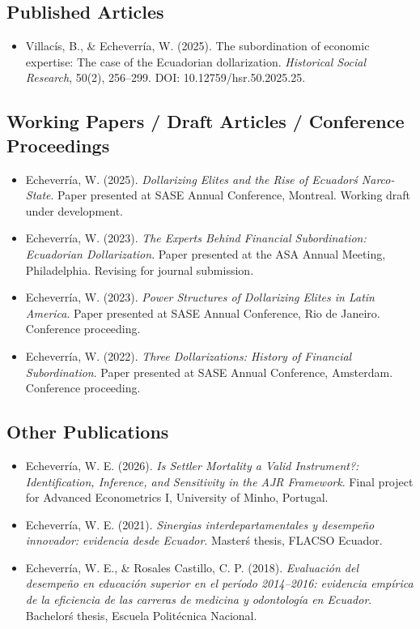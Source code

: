 ﻿\documentclass[11pt]{article}
\begin{document}
\subsection*{Published Articles}
\begin{itemize}
\item Villac\'is, B., \& Echeverr\'ia, W. (2025). The subordination of economic expertise: The case of the Ecuadorian dollarization. \textit{Historical Social Research}, 50(2), 256--299. DOI: 10.12759/hsr.50.2025.25.
\end{itemize}

\subsection*{Working Papers / Draft Articles / Conference Proceedings}
\begin{itemize}
\item Echeverr\'ia, W. (2025). \textit{Dollarizing Elites and the Rise of Ecuador\'s Narco-State}. Paper presented at SASE Annual Conference, Montreal. Working draft under development.
\item Echeverr\'ia, W. (2023). \textit{The Experts Behind Financial Subordination: Ecuadorian Dollarization}. Paper presented at the ASA Annual Meeting, Philadelphia. Revising for journal submission.
\item Echeverr\'ia, W. (2023). \textit{Power Structures of Dollarizing Elites in Latin America}. Paper presented at SASE Annual Conference, Rio de Janeiro. Conference proceeding.
\item Echeverr\'ia, W. (2022). \textit{Three Dollarizations: History of Financial Subordination}. Paper presented at SASE Annual Conference, Amsterdam. Conference proceeding.
\end{itemize}

\subsection*{Other Publications}
\begin{itemize}
\item Echeverr\'ia, W. E. (2026). \textit{Is Settler Mortality a Valid Instrument?: Identification, Inference, and Sensitivity in the AJR Framework}. Final project for Advanced Econometrics I, University of Minho, Portugal.
\item Echeverr\'ia, W. E. (2021). \textit{Sinergias interdepartamentales y desempe\~no innovador: evidencia desde Ecuador}. Master\'s thesis, FLACSO Ecuador.
\item Echeverr\'ia, W. E., \& Rosales Castillo, C. P. (2018). \textit{Evaluaci\'on del desempe\~no en educaci\'on superior en el per\'iodo 2014--2016: evidencia emp\'irica de la eficiencia de las carreras de medicina y odontolog\'ia en Ecuador}. Bachelor\'s thesis, Escuela Polit\'ecnica Nacional.
\end{itemize}
\end{document}
